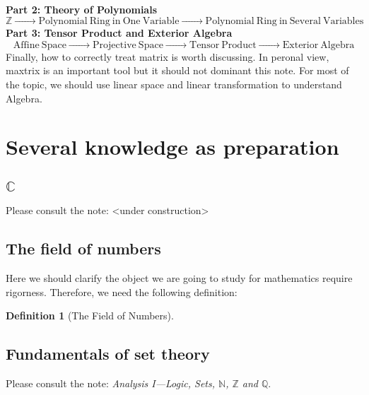 \documentclass[a4paper,oneside]{book}
\newtheorem{definition}{Definition}[section]
\begin{document}
			\noindent\textbf{Part 2: Theory of Polynomials}
			\begin{equation*}
			\mathbb{Z} \xrightarrow{\quad\quad\quad} \mathrm{Polynomial~Ring~in~One~Variable} \xrightarrow{\quad\quad\quad} \mathrm{Polynomial~Ring~in~Several~Variables}
			\end{equation*}
			\textbf{Part 3: Tensor Product and Exterior Algebra}
			\begin{equation*}
			\mathrm{Affine~Space} \xrightarrow{\quad\quad\quad} \mathrm{Projective~Space} \xrightarrow{\quad\quad\quad} \mathrm{Tensor~Product} \xrightarrow{\quad\quad\quad} \mathrm{Exterior~Algebra}
			\end{equation*}
			Finally, how to correctly treat matrix is worth discussing. In peronal view, maxtrix is an important tool but it should not dominant this note. For most of the topic, we should use linear space and linear transformation to understand Algebra.
			\section{Several knowledge as preparation}
				\subsection{$\mathbb{C}$}
					Please consult the note: <under construction>
				\subsection{The field of numbers}
					Here we should clarify the object we are going to study for mathematics require rigorness. Therefore, we need the following definition:
					\begin{definition}[The Field of Numbers]
						
					\end{definition}
				\subsection{Fundamentals of set theory}
					Please consult the note: \textit{Analysis I---Logic, Sets, $\mathbb{N}$, $\mathbb{Z}$ and $\mathbb{Q}$}.
\end{document}
